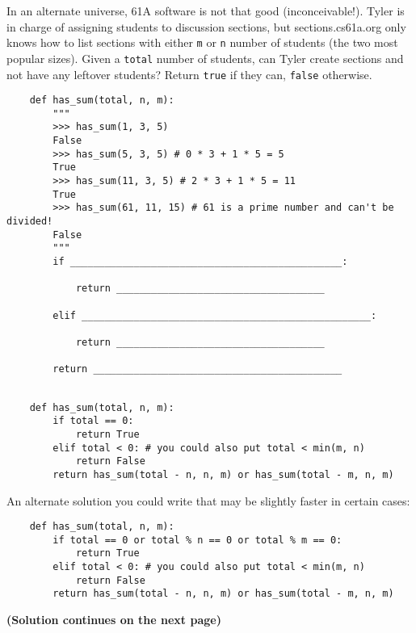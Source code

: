 \begin{blocksection}
    \question In an alternate universe, 61A software is not that good (inconceivable!). 
    Tyler is in charge of assigning students to discussion sections, but sections.cs61a.org 
    only knows how to list sections with either \lstinline$m$ or \lstinline$n$ number of students (the two most popular sizes). 
    Given a \lstinline$total$ number of students, can Tyler create sections and not have any leftover students? 
    Return \lstinline$true$ if they can, \lstinline$false$ otherwise.
    
    \begin{lstlisting}
    def has_sum(total, n, m):
        """
        >>> has_sum(1, 3, 5)
        False
        >>> has_sum(5, 3, 5) # 0 * 3 + 1 * 5 = 5
        True
        >>> has_sum(11, 3, 5) # 2 * 3 + 1 * 5 = 11
        True
        >>> has_sum(61, 11, 15) # 61 is a prime number and can't be divided!
        False
        """
        if _______________________________________________:
    
            return ____________________________________
    
        elif __________________________________________________:
    
            return ____________________________________
    
        return ___________________________________________
    
    \end{lstlisting}
    \end{blocksection}
    
    \begin{solution}[1.5in]
    \begin{blocksection}
    \begin{lstlisting}
    def has_sum(total, n, m):
        if total == 0:
            return True
        elif total < 0: # you could also put total < min(m, n)
            return False
        return has_sum(total - n, n, m) or has_sum(total - m, n, m)
    \end{lstlisting}
    An alternate solution you could write that may be slightly faster in certain cases:
    \begin{lstlisting}
    def has_sum(total, n, m):
        if total == 0 or total % n == 0 or total % m == 0:
            return True
        elif total < 0: # you could also put total < min(m, n)
            return False
        return has_sum(total - n, n, m) or has_sum(total - m, n, m)
    \end{lstlisting}
    
    \textbf{(Solution continues on the next page)}
    \end{blocksection}
    \end{solution}
    
